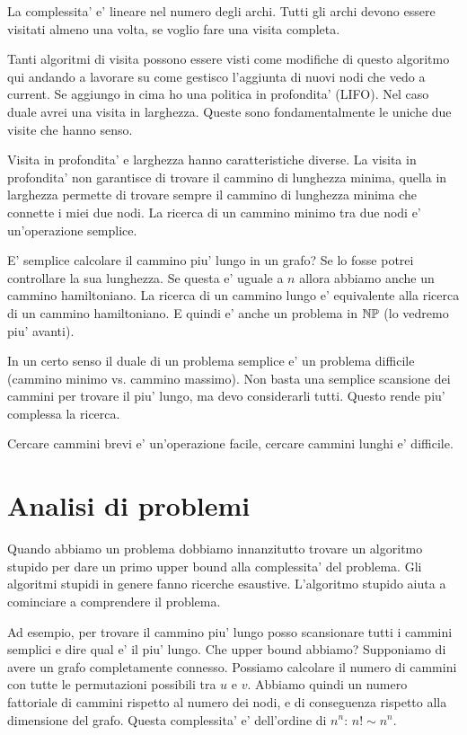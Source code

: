 La complessita' e' lineare nel numero degli archi. Tutti gli archi devono essere visitati almeno una
volta, se voglio fare una visita completa.

Tanti algoritmi di visita possono essere visti come modifiche di questo algoritmo qui andando a
lavorare su come gestisco l'aggiunta di nuovi nodi che vedo a current. Se aggiungo in cima ho una
politica in profondita' (LIFO). Nel caso duale avrei una visita in larghezza. Queste sono
fondamentalmente le uniche due visite che hanno senso.

Visita in profondita' e larghezza hanno caratteristiche diverse. La visita in profondita' non
garantisce di trovare il cammino di lunghezza minima, quella in larghezza permette di trovare sempre
il cammino di lunghezza minima che connette i miei due nodi. La ricerca di un cammino minimo tra due
nodi e' un'operazione semplice.

E' semplice calcolare il cammino piu' lungo in un grafo? Se lo fosse potrei controllare la sua
lunghezza. Se questa e' uguale a $n$ allora abbiamo anche un cammino hamiltoniano. La ricerca di un
cammino lungo e' equivalente alla ricerca di un cammino hamiltoniano. E quindi e' anche un problema
in $\mathbb{NP}$ (lo vedremo piu' avanti).

In un certo senso il duale di un problema semplice e' un problema difficile (cammino minimo vs.
cammino massimo). Non basta una semplice scansione dei cammini per trovare il piu' lungo, ma devo
considerarli tutti. Questo rende piu' complessa la ricerca.

Cercare cammini brevi e' un'operazione facile, cercare cammini lunghi e' difficile.

\section{Analisi di problemi}

Quando abbiamo un problema dobbiamo innanzitutto trovare un algoritmo stupido per dare un primo
upper bound alla complessita' del problema. Gli algoritmi stupidi in genere fanno ricerche
esaustive. L'algoritmo stupido aiuta a cominciare a comprendere il problema.

Ad esempio, per trovare il cammino piu' lungo posso scansionare tutti i cammini semplici e dire qual
e' il piu' lungo. Che upper bound abbiamo? Supponiamo di avere un grafo completamente connesso.
Possiamo calcolare il numero di cammini con tutte le permutazioni possibili tra $u$ e $v$. Abbiamo
quindi un numero fattoriale di cammini rispetto al numero dei nodi, e di conseguenza rispetto alla
dimensione del grafo. Questa complessita' e' dell'ordine di $n^{n}$: $n! \sim n^{n}$. 

